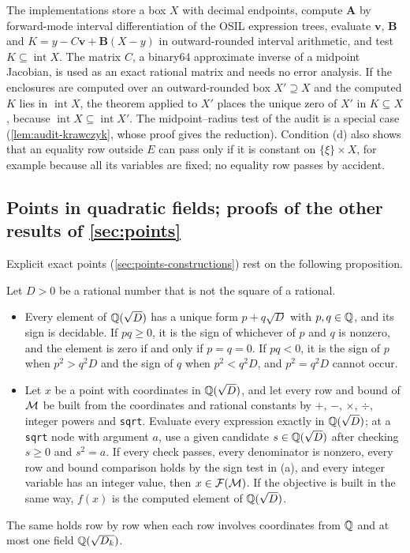 The implementations store a box $X$ with decimal endpoints, compute $\mathbf{A}$ by forward-mode interval differentiation of the OSIL expression trees, evaluate $\mathbf{v}$, $\mathbf{B}$ and $K=y-C\mathbf{v}+\mathbf{B}(X-y)$ in outward-rounded interval arithmetic, and test $K\subseteq\operatorname{int}X$.
The matrix $C$, a binary64 approximate inverse of a midpoint Jacobian, is used as an exact rational matrix and needs no error analysis.
If the enclosures are computed over an outward-rounded box $X'\supseteq X$ and the computed $K$ lies in $\operatorname{int}X$, the theorem applied to $X'$ places the unique zero of $X'$ in $K\subseteq X$, because $\operatorname{int}X\subseteq\operatorname{int}X'$.
The midpoint--radius test of the audit is a special case (\cref{lem:audit-krawczyk}, whose proof gives the reduction).
Condition (d) also shows that an equality row outside $E$ can pass only if it is constant on $\{\xi\}\times X$, for example because all its variables are fixed; no equality row passes by accident.

\subsection{Points in quadratic fields; proofs of the other results of \texorpdfstring{\cref{sec:points}}{Section 6}}\label{app:points-props}

Explicit exact points (\cref{sec:points-constructions}) rest on the following proposition.

\begin{proposition}\label{prop:pts-exact}
Let $D>0$ be a rational number that is not the square of a rational.
\begin{itemize}
\item[(a)] Every element of $\mathbb{Q}(\sqrt D)$ has a unique form $p+q\sqrt D$ with $p,q\in\mathbb{Q}$, and its sign is decidable.
If $pq\ge0$, it is the sign of whichever of $p$ and $q$ is nonzero, and the element is zero if and only if $p=q=0$.
If $pq<0$, it is the sign of $p$ when $p^2>q^2D$ and the sign of $q$ when $p^2<q^2D$, and $p^2=q^2D$ cannot occur.
\item[(b)] Let $x$ be a point with coordinates in $\mathbb{Q}(\sqrt D)$, and let every row and bound of $\mathcal{M}$ be built from the coordinates and rational constants by $+$, $-$, $\times$, $\div$, integer powers and \texttt{sqrt}.
Evaluate every expression exactly in $\mathbb{Q}(\sqrt D)$; at a \texttt{sqrt} node with argument $a$, use a given candidate $s\in\mathbb{Q}(\sqrt D)$ after checking $s\ge0$ and $s^2=a$.
If every check passes, every denominator is nonzero, every row and bound comparison holds by the sign test in (a), and every integer variable has an integer value, then $x\in\mathcal{F}(\mathcal{M})$.
If the objective is built in the same way, $f(x)$ is the computed element of $\mathbb{Q}(\sqrt D)$.
\end{itemize}
The same holds row by row when each row involves coordinates from $\mathbb{Q}$ and at most one field $\mathbb{Q}(\sqrt{D_k})$.
\end{proposition}

